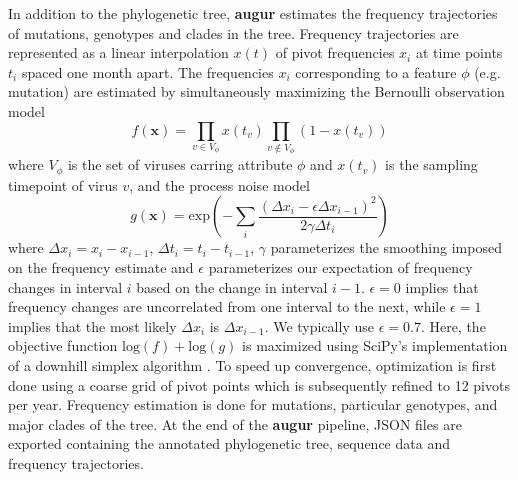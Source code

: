\documentclass{bioinfo}
\newcommand{\augur}{\textbf{augur}}
\begin{document}
In addition to the phylogenetic tree, \augur{} estimates the frequency trajectories of mutations, genotypes and clades in the tree. 
Frequency trajectories are represented as a linear interpolation $x(t)$ of pivot frequencies $x_i$ at time points $t_i$ spaced one month apart. 
The frequencies $x_i$ corresponding to a feature $\phi$ (e.g. mutation) are estimated by simultaneously maximizing the Bernoulli observation model 
\begin{equation}
	\label{eq:obs}
	f(\mathbf{x}) = \prod_{v\in V_\phi} x(t_v) \prod_{v\notin V_{\phi}} (1-x(t_v))
\end{equation}
where $V_{\phi}$ is the set of viruses carring attribute $\phi$ and $x(t_v)$ is the sampling timepoint of virus $v$, and the process noise model
\begin{equation}
	\label{eq:freq}
	g(\mathbf{x}) = \mathrm{exp}\left(
		-\sum_i \frac{(\Delta x_i - \epsilon\Delta x_{i-1})^2}{2\gamma \Delta t_i}
	\right)
\end{equation}
where $\Delta x_i = x_i-x_{i-1}$, $\Delta t_i = t_i-t_{i-1}$, $\gamma$ parameterizes the smoothing imposed on the frequency estimate and $\epsilon$ parameterizes our expectation of frequency changes in interval $i$ based on the  change in interval $i-1$.
$\epsilon=0$ implies that frequency changes are uncorrelated from one interval to the next, while $\epsilon=1$ implies that the most likely $\Delta x_i$ is $\Delta x_{i-1}$.
We typically use $\epsilon = 0.7$.
Here, the objective function $\mathrm{log}(f) + \mathrm{log}(g)$ is maximized using SciPy's implementation of a downhill simplex algorithm \citep{oliphant_python_2007}.
To speed up convergence, optimization is first done using a coarse grid of pivot points which is subsequently refined to 12 pivots per year. Frequency estimation is done for mutations, particular genotypes, and major clades of the tree.
At the end of the \augur{} pipeline, JSON files are exported containing the annotated phylogenetic tree, sequence data and frequency trajectories.
\end{document}
